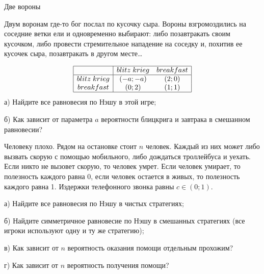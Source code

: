 \begin{problem}
 Две вороны\par
Двум воронам где-то бог послал по кусочку сыра. Вороны взгромоздились на соседние ветки ели и одновременно выбирают: либо позавтракать своим кусочком, либо провести стремительное нападение на соседку и, похитив ее кусочек сыра, позавтракать в другом месте\ldots \par
\[\begin{array}{|c|cc|}
\hline
{} & {blitz\; krieg} & {breakfast} \\
\hline
{blitz\; krieg} & {\left(-a;-a\right)} & {\left(2;0\right)} \\
{breakfast} & {\left(0;2\right)} & {\left(1;1\right)} \\
\hline
\end{array}\]
а) Найдите все равновесия по Нэшу в этой игре;\par
б) Как зависит от параметра  $a$  вероятности блицкрига и завтрака в смешанном равновесии?\par




\begin{sol}

\end{sol}
\end{problem}



\begin{problem}

Человеку плохо. Рядом на остановке стоит $n$  человек. Каждый из них может либо вызвать скорую с помощью мобильного, либо дождаться троллейбуса и уехать. Если никто не вызовет скорую, то человек умрет. Если человек умирает, то полезность каждого равна 0, если человек остается в живых, то полезность каждого равна 1. Издержки телефонного звонка равны  $c\in \left(0;1\right)$.\par
а) Найдите все равновесия по Нэшу в чистых стратегиях;\par
б) Найдите симметричное равновесие по Нэшу в смешанных стратегиях (все игроки используют одну и ту же стратегию);\par
в) Как зависит от  $n$  вероятность оказания помощи отдельным прохожим?\par
г) Как зависит от  $n$  вероятность получения помощи?\par




\begin{sol}

\end{sol}
\end{problem}




